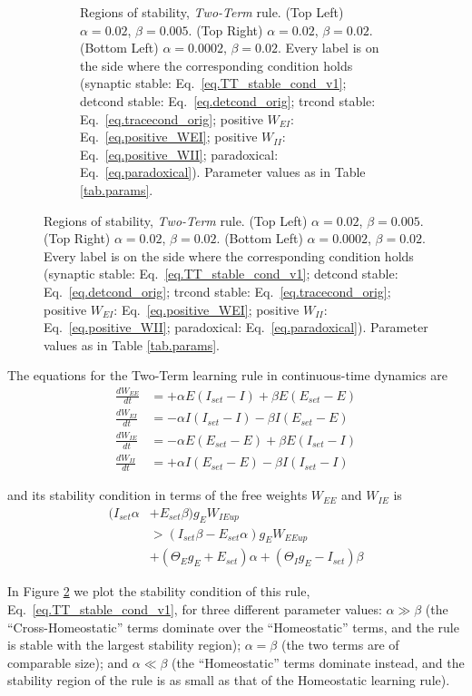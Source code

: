 \documentclass[twocolumn]{article}
\newcommand{\EE}{\mathit{EE}}
\newcommand{\EI}{\mathit{EI}}
\newcommand{\IE}{\mathit{IE}}
\newcommand{\II}{\mathit{II}}
\newcommand{\set}{\mathit{set}}
\newcommand{\up}{\mathit{up}}
\begin{document}
\begin{figure}[!ht]
{\begin{figure}[H]
\caption{Regions of stability, {\em Two-Term} rule. (Top Left) $\alpha=0.02$, $\beta=0.005$. (Top Right) $\alpha=0.02$, $\beta=0.02$. (Bottom Left) $\alpha=0.0002$, $\beta=0.02$. Every label is on the side where the  corresponding  condition  holds (synaptic stable: Eq.\ \ref{eq.TT_stable_cond_v1}; detcond stable: Eq.\ \ref{eq.detcond_orig}; trcond stable: Eq.\ \ref{eq.tracecond_orig}; positive $W_{\EI}$: Eq.\ \ref{eq.positive_WEI}; positive $W_{\II}$: Eq.\ \ref{eq.positive_WII}; paradoxical: Eq.\ \ref{eq.paradoxical}). Parameter values as in Table \ref{tab.params}.}
\label{fig.TT_stability}
\end{figure}}
\end{figure}



The equations for the Two-Term learning rule in continuous-time dynamics are
\begin{equation}
\begin{aligned}
\frac{dW_{\EE}}{dt} & = +\alpha E (I_{\set} - I) + \beta E (E_{\set} - E) \\
\frac{dW_{\EI}}{dt} & = -\alpha I (I_{\set} - I) - \beta I (E_{\set} - E) \\
\frac{dW_{\IE}}{dt} & = -\alpha E (E_{\set} - E) + \beta E (I_{\set} - I) \\
\frac{dW_{\II}}{dt} & = +\alpha I (E_{\set} - E) - \beta I (I_{\set} - I)
\end{aligned}
\label{eq.TT_summary}
\end{equation}

\noindent and its stability condition in terms of the free weights $W_{\EE}$ and $W_{\IE}$ is
\begin{equation}
\begin{aligned}
(I_{\set} \alpha & + E_{\set} \beta) g_E W_{\IE\up} \\
& > (I_{\set} \beta - E_{\set} \alpha) g_E W_{\EE\up} \\
& + (\Theta_E g_E + E_{\set}) \alpha + (\Theta_I g_E - I_{\set}) \beta
\end{aligned}
\label{eq.TT_stable_cond_v1}
\end{equation}

In Figure \ref{fig.TT_stability} we plot the stability condition of this rule, Eq.\ \ref{eq.TT_stable_cond_v1}, for three different parameter values: $\alpha \gg \beta$ (the ``Cross-Homeostatic'' terms dominate over the ``Homeostatic'' terms, and the rule is stable with the largest stability region); $\alpha = \beta$ (the two terms are of comparable size); and $\alpha \ll \beta$ (the ``Homeostatic'' terms dominate instead, and the stability region of the rule is as small as that of the Homeostatic learning rule).
\end{document}
